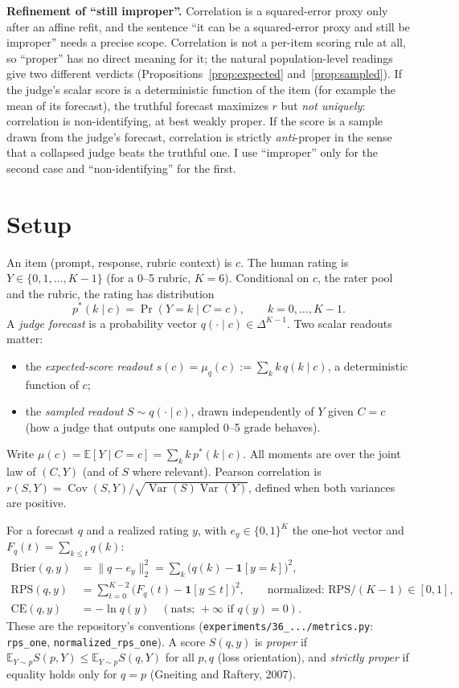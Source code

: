 \documentclass[11pt]{article}
\theoremstyle{remark}
\theoremstyle{definition}
\newcommand{\E}{\mathbb{E}}
\newcommand{\Var}{\operatorname{Var}}
\newcommand{\Cov}{\operatorname{Cov}}
\newcommand{\pstar}{p^{*}}
\newcommand{\onehot}{e}
\newcommand{\RPS}{\mathrm{RPS}}
\newcommand{\Brier}{\mathrm{Brier}}
\newcommand{\CE}{\mathrm{CE}}
\newcommand{\1}{\mathbf{1}}
\newcommand{\file}[1]{\nolinkurl{#1}}
\begin{document}
\textbf{Refinement of ``still improper''.} Correlation is a squared-error proxy only after an affine refit, and the sentence ``it can be a squared-error proxy and still be improper'' needs a precise scope. Correlation is not a per-item scoring rule at all, so ``proper'' has no direct meaning for it; the natural population-level readings give two different verdicts (Propositions~\ref{prop:expected} and~\ref{prop:sampled}). If the judge's scalar score is a deterministic function of the item (for example the mean of its forecast), the truthful forecast maximizes $r$ but \emph{not uniquely}: correlation is non-identifying, at best weakly proper. If the score is a sample drawn from the judge's forecast, correlation is strictly \emph{anti}-proper in the sense that a collapsed judge beats the truthful one. I use ``improper'' only for the second case and ``non-identifying'' for the first.

\section{Setup}
\label{sec:setup}

An item (prompt, response, rubric context) is $c$. The human rating is $Y\in\{0,1,\dots,K-1\}$ (for a 0--5 rubric, $K=6$). Conditional on $c$, the rater pool and the rubric, the rating has distribution
\[
\pstar(k\mid c)=\Pr(Y=k\mid C=c),\qquad k=0,\dots,K-1 .
\]
A \emph{judge forecast} is a probability vector $q(\cdot\mid c)\in\Delta^{K-1}$. Two scalar readouts matter:
\begin{itemize}
\item the \emph{expected-score readout} $s(c)=\mu_q(c):=\sum_k k\,q(k\mid c)$, a deterministic function of $c$;
\item the \emph{sampled readout} $S\sim q(\cdot\mid c)$, drawn independently of $Y$ given $C=c$ (how a judge that outputs one sampled 0--5 grade behaves).
\end{itemize}
Write $\mu(c)=\E[Y\mid C=c]=\sum_k k\,\pstar(k\mid c)$. All moments are over the joint law of $(C,Y)$ (and of $S$ where relevant). Pearson correlation is $r(S,Y)=\Cov(S,Y)/\sqrt{\Var(S)\Var(Y)}$, defined when both variances are positive.

For a forecast $q$ and a realized rating $y$, with $\onehot_y\in\{0,1\}^K$ the one-hot vector and $F_q(t)=\sum_{k\le t}q(k)$:
\begin{align*}
\Brier(q,y)&=\|q-\onehot_y\|_2^{2}=\sum_{k}\bigl(q(k)-\1[y=k]\bigr)^{2},\\
\RPS(q,y)&=\sum_{t=0}^{K-2}\bigl(F_q(t)-\1[y\le t]\bigr)^{2},\qquad \text{normalized: } \RPS/(K-1)\in[0,1],\\
\CE(q,y)&=-\ln q(y)\quad(\text{nats; }+\infty\text{ if }q(y)=0).
\end{align*}
These are the repository's conventions (\file{experiments/36\_.../metrics.py}: \texttt{rps\_one}, \texttt{normalized\_rps\_one}). A score $S(q,y)$ is \emph{proper} if $\E_{Y\sim p}S(p,Y)\le\E_{Y\sim p}S(q,Y)$ for all $p,q$ (loss orientation), and \emph{strictly proper} if equality holds only for $q=p$ (Gneiting and Raftery, 2007).
\end{document}
